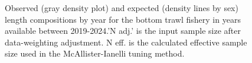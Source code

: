 \documentclass[
]{scrartcl}
\begin{document}
\begin{figure}[H]


\caption{\label{fig-len-fit-bt-2}Observed (gray density plot) and
expected (density lines by sex) length compositions by year for the
bottom trawl fishery in years available between 2019-2024.'N adj.' is
the input sample size after data-weighting adjustment. N eff. is the
calculated effective sample size used in the McAllister-Ianelli tuning
method.}

\end{figure}%
\end{document}
